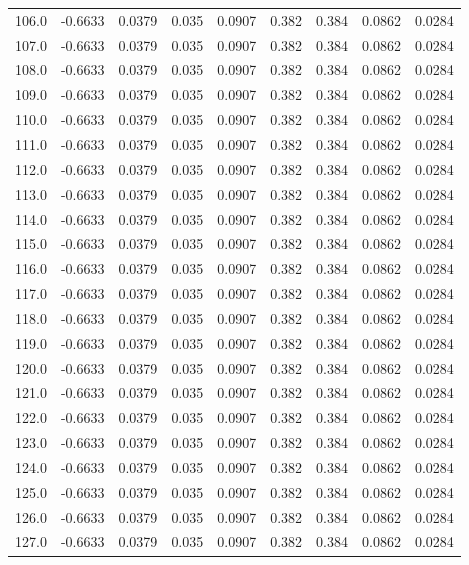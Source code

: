 \begin{longtable}{lrrrrrrrr}
106.0 & -0.6633 & 0.0379 & 0.035 & 0.0907 & 0.382 & 0.384 & 0.0862 & 0.0284 \\
107.0 & -0.6633 & 0.0379 & 0.035 & 0.0907 & 0.382 & 0.384 & 0.0862 & 0.0284 \\
108.0 & -0.6633 & 0.0379 & 0.035 & 0.0907 & 0.382 & 0.384 & 0.0862 & 0.0284 \\
109.0 & -0.6633 & 0.0379 & 0.035 & 0.0907 & 0.382 & 0.384 & 0.0862 & 0.0284 \\
110.0 & -0.6633 & 0.0379 & 0.035 & 0.0907 & 0.382 & 0.384 & 0.0862 & 0.0284 \\
111.0 & -0.6633 & 0.0379 & 0.035 & 0.0907 & 0.382 & 0.384 & 0.0862 & 0.0284 \\
112.0 & -0.6633 & 0.0379 & 0.035 & 0.0907 & 0.382 & 0.384 & 0.0862 & 0.0284 \\
113.0 & -0.6633 & 0.0379 & 0.035 & 0.0907 & 0.382 & 0.384 & 0.0862 & 0.0284 \\
114.0 & -0.6633 & 0.0379 & 0.035 & 0.0907 & 0.382 & 0.384 & 0.0862 & 0.0284 \\
115.0 & -0.6633 & 0.0379 & 0.035 & 0.0907 & 0.382 & 0.384 & 0.0862 & 0.0284 \\
116.0 & -0.6633 & 0.0379 & 0.035 & 0.0907 & 0.382 & 0.384 & 0.0862 & 0.0284 \\
117.0 & -0.6633 & 0.0379 & 0.035 & 0.0907 & 0.382 & 0.384 & 0.0862 & 0.0284 \\
118.0 & -0.6633 & 0.0379 & 0.035 & 0.0907 & 0.382 & 0.384 & 0.0862 & 0.0284 \\
119.0 & -0.6633 & 0.0379 & 0.035 & 0.0907 & 0.382 & 0.384 & 0.0862 & 0.0284 \\
120.0 & -0.6633 & 0.0379 & 0.035 & 0.0907 & 0.382 & 0.384 & 0.0862 & 0.0284 \\
121.0 & -0.6633 & 0.0379 & 0.035 & 0.0907 & 0.382 & 0.384 & 0.0862 & 0.0284 \\
122.0 & -0.6633 & 0.0379 & 0.035 & 0.0907 & 0.382 & 0.384 & 0.0862 & 0.0284 \\
123.0 & -0.6633 & 0.0379 & 0.035 & 0.0907 & 0.382 & 0.384 & 0.0862 & 0.0284 \\
124.0 & -0.6633 & 0.0379 & 0.035 & 0.0907 & 0.382 & 0.384 & 0.0862 & 0.0284 \\
125.0 & -0.6633 & 0.0379 & 0.035 & 0.0907 & 0.382 & 0.384 & 0.0862 & 0.0284 \\
126.0 & -0.6633 & 0.0379 & 0.035 & 0.0907 & 0.382 & 0.384 & 0.0862 & 0.0284 \\
127.0 & -0.6633 & 0.0379 & 0.035 & 0.0907 & 0.382 & 0.384 & 0.0862 & 0.0284 \\

\end{longtable}
